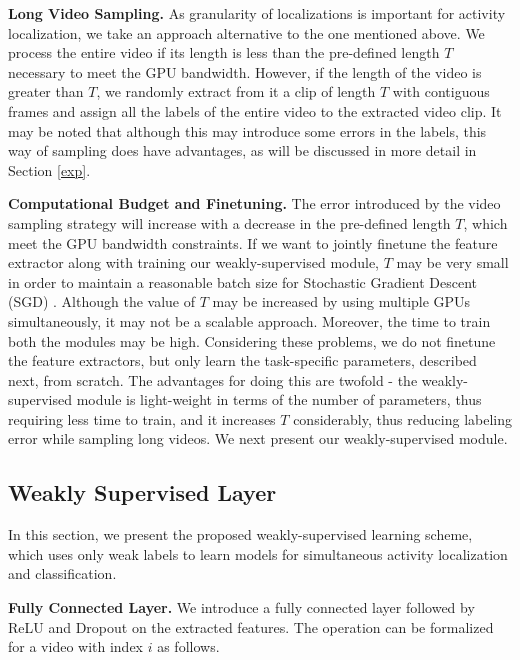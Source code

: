 \documentclass[runningheads]{llncs}
\begin{document}
\textbf{Long Video Sampling.} As granularity of localizations is important for activity localization, we take an approach alternative to the one mentioned above. We process the entire video if its length is less than the pre-defined length $T$ necessary to meet the GPU bandwidth. However, if the length of the video is greater than $T$, we randomly extract from it a clip of length $T$ with contiguous frames and assign all the labels of the entire video to the extracted video clip. It may be noted that although this may introduce some errors in the labels, this way of sampling does have advantages, as will be discussed in more detail in Section \ref{exp}. 

\textbf{Computational Budget and Finetuning.} The error introduced by the video sampling strategy will increase with a decrease in the pre-defined length $T$, which meet the GPU bandwidth constraints. If we want to jointly finetune the feature extractor along with training our weakly-supervised module, $T$ may be very small in order to maintain a reasonable batch size for Stochastic Gradient Descent (SGD) \cite{bottou2010large}. Although the value of $T$ may be increased by using multiple GPUs simultaneously, it may not be a scalable approach. Moreover, the time to train both the modules may be high. Considering these problems, we do not finetune the feature extractors, but only learn the task-specific parameters, described next, from scratch. The advantages for doing this are twofold - the weakly-supervised module is light-weight in terms of the number of parameters, thus requiring less time to train, and it increases $T$ considerably, thus reducing labeling error while sampling long videos. We next present our weakly-supervised module.

\subsection{Weakly Supervised Layer}

In this section, we present the proposed weakly-supervised learning scheme, which uses only weak labels to learn models for simultaneous activity localization and classification. 

\textbf{Fully Connected Layer.} We introduce a fully connected layer followed by ReLU \cite{nair2010rectified} and Dropout \cite{srivastava2014dropout} on the extracted features. The operation can be formalized for a video with index $i$ as follows.
\end{document}
